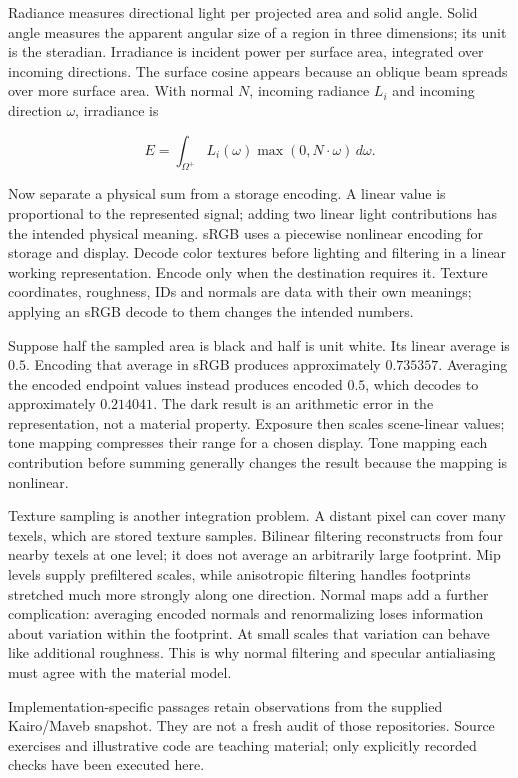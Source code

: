 Radiance measures directional light per projected area and solid angle. Solid angle measures the apparent angular size of a region in three dimensions; its unit is the steradian. Irradiance is incident power per surface area, integrated over incoming directions. The surface cosine appears because an oblique beam spreads over more surface area. With normal \(N\), incoming radiance \(L_i\) and incoming direction \(\omega\), irradiance is

\[
E=\int_{\Omega^+}L_i(\omega)\max(0,N\cdot\omega)\,d\omega.
\]

Now separate a physical sum from a storage encoding. A linear value is proportional to the represented signal; adding two linear light contributions has the intended physical meaning. sRGB uses a piecewise nonlinear encoding for storage and display. Decode color textures before lighting and filtering in a linear working representation. Encode only when the destination requires it. Texture coordinates, roughness, IDs and normals are data with their own meanings; applying an sRGB decode to them changes the intended numbers.

Suppose half the sampled area is black and half is unit white. Its linear average is \(0.5\). Encoding that average in sRGB produces approximately \(0.735357\). Averaging the encoded endpoint values instead produces encoded \(0.5\), which decodes to approximately \(0.214041\). The dark result is an arithmetic error in the representation, not a material property. Exposure then scales scene-linear values; tone mapping compresses their range for a chosen display. Tone mapping each contribution before summing generally changes the result because the mapping is nonlinear.

Texture sampling is another integration problem. A distant pixel can cover many texels, which are stored texture samples. Bilinear filtering reconstructs from four nearby texels at one level; it does not average an arbitrarily large footprint. Mip levels supply prefiltered scales, while anisotropic filtering handles footprints stretched much more strongly along one direction. Normal maps add a further complication: averaging encoded normals and renormalizing loses information about variation within the footprint. At small scales that variation can behave like additional roughness. This is why normal filtering and specular antialiasing must agree with the material model.

Implementation-specific passages retain observations from the supplied Kairo/Maveb snapshot. They are not a fresh audit of those repositories. Source exercises and illustrative code are teaching material; only explicitly recorded checks have been executed here.

